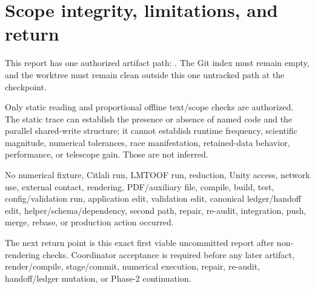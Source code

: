 \documentclass[10pt]{article}
\begin{document}
\section{Scope integrity, limitations, and return}

This report has one authorized artifact path:
.
The Git index must remain empty, and the worktree must remain clean outside
this one untracked path at the checkpoint.

Only static reading and proportional offline text/scope checks are authorized.
The static trace can establish the presence or absence of named code and the
parallel shared-write structure; it cannot establish runtime frequency,
scientific magnitude, numerical tolerances, race manifestation, retained-data
behavior, performance, or telescope gain.  Those are not inferred.

No numerical fixture, Citlali run, LMTOOF run, reduction, Unity access,
network use, external contact, rendering, PDF/auxiliary file, compile, build,
test, config/validation run, application edit, validation edit, canonical
ledger/handoff edit, helper/schema/dependency, second path, repair, re-audit,
integration, push, merge, rebase, or production action occurred.

The next return point is this exact first viable uncommitted report after
non-rendering checks.  Coordinator acceptance is required before any later
artifact, render/compile, stage/commit, numerical execution, repair, re-audit,
handoff/ledger mutation, or Phase-2 continuation.
\end{document}
